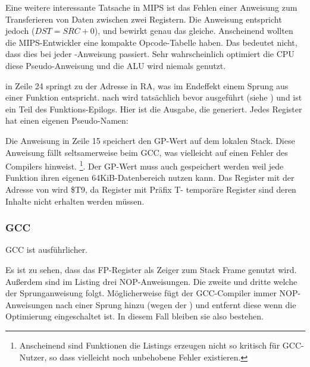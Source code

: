 Eine weitere interessante Tatsache in MIPS ist das Fehlen einer Anweisung zum Transferieren
von Daten zwischen zwei Registern.
Die Anweisung  entspricht jedoch  ($DST=SRC+0$),
und bewirkt genau das gleiche.
Anscheinend wollten die MIPS-Entwickler eine kompakte Opcode-Tabelle haben.
Das bedeutet nicht, dass dies bei jeder -Anweisung passiert.
Sehr wahrscheinlich optimiert die \ac{CPU} diese Pseudo-Anweisung und die \ac{ALU}
wird niemals genutzt.


 in Zeile 24 springt zu der Adresse in \ac{RA}, was im Endeffekt einem Sprung aus einer Funktion entspricht.
 nach  wird tatsächlich bevor  ausgeführt (siehe ) und ist
ein Teil des Funktions-Epilogs.
Hier ist die Ausgabe, die \IDA generiert. Jedes Register hat einen eigenen Pseudo-Namen:



Die Anweisung in Zeile 15 speichert den GP-Wert auf dem lokalen Stack. Diese Anweisung fällt seltsamerweise
beim GCC, was vielleicht auf einen Fehler des Compilers hinweist. \footnote{Anscheinend sind Funktionen die
Listings erzeugen nicht so kritisch für GCC-Nutzer, so dass vielleicht noch unbehobene Fehler existieren.}.
Der GP-Wert muss auch gespeichert werden weil jede Funktion ihren eigenen 64KiB-Datenbereich nutzen kann.
Das Register mit der Adresse von \puts wird \$T9, da Register mit Präfix T- temporäre Register sind deren
Inhalte nicht erhalten werden müssen.

\subsubsection{\NonOptimizing GCC}

\NonOptimizing GCC ist ausführlicher.



Es ist zu sehen, dass das FP-Register als Zeiger zum Stack Frame genutzt wird.
Außerdem sind im Listing drei \ac{NOP}-Anweisungen.
Die zweite und dritte welche der Sprunganweisung folgt.
Möglicherweise fügt der GCC-Compiler immer \ac{NOP}-Anweisungen nach einer Sprung hinzu
(wegen der ) und entfernt diese wenn die Optimierung eingeschaltet ist.
In diesem Fall bleiben sie also bestehen.

